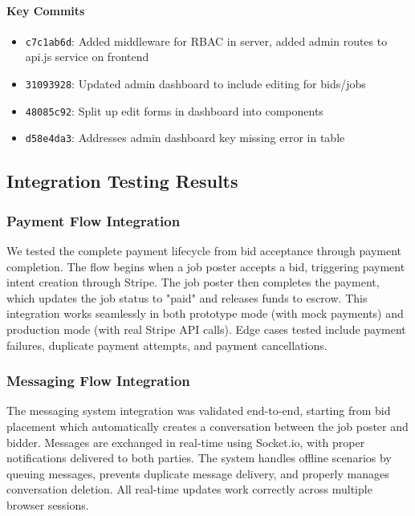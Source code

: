 \documentclass[11pt]{article}
\begin{document}
\paragraph{Key Commits}
\begin{itemize}[leftmargin=1.4em]
  \item \texttt{c7c1ab6d}: Added middleware for RBAC in server, added admin routes to api.js service on frontend
  \item \texttt{31093928}: Updated admin dashboard to include editing for bids/jobs
  \item \texttt{48085c92}: Split up edit forms in dashboard into components
  \item \texttt{d58e4da3}: Addresses admin dashboard key missing error in table
\end{itemize}

\subsection{Integration Testing Results}

\subsubsection{Payment Flow Integration}
We tested the complete payment lifecycle from bid acceptance through payment completion. The flow begins when a job poster accepts a bid, triggering payment intent creation through Stripe. The job poster then completes the payment, which updates the job status to "paid" and releases funds to escrow. This integration works seamlessly in both prototype mode (with mock payments) and production mode (with real Stripe API calls). Edge cases tested include payment failures, duplicate payment attempts, and payment cancellations.

\subsubsection{Messaging Flow Integration}
The messaging system integration was validated end-to-end, starting from bid placement which automatically creates a conversation between the job poster and bidder. Messages are exchanged in real-time using Socket.io, with proper notifications delivered to both parties. The system handles offline scenarios by queuing messages, prevents duplicate message delivery, and properly manages conversation deletion. All real-time updates work correctly across multiple browser sessions.
\end{document}
